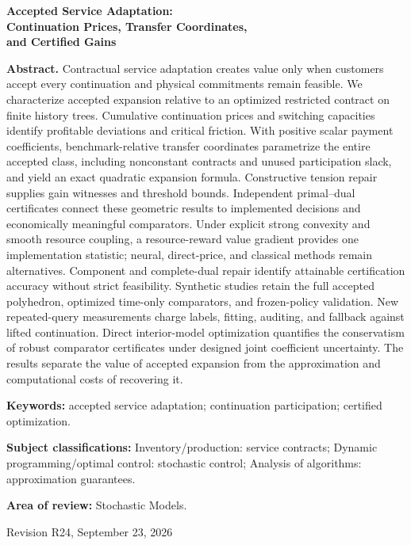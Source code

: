 \documentclass[11pt,letterpaper]{article}
\theoremstyle{definition}
\newcommand{\1}{\mathbf 1}
\begin{document}
\begin{titlepage}\centering
{\Large\bfseries Accepted Service Adaptation:\\ Continuation Prices, Transfer Coordinates,\\ and Certified Gains\par}
\vspace{.3in}{Anonymous manuscript for Operations Research\par}\vspace{.25in}
\begin{minipage}{\textwidth}
\textbf{Abstract.}
Contractual service adaptation creates value only when customers accept every continuation and physical commitments remain feasible. We characterize accepted expansion relative to an optimized restricted contract on finite history trees. Cumulative continuation prices and switching capacities identify profitable deviations and critical friction. With positive scalar payment coefficients, benchmark-relative transfer coordinates parametrize the entire accepted class, including nonconstant contracts and unused participation slack, and yield an exact quadratic expansion formula. Constructive tension repair supplies gain witnesses and threshold bounds. Independent primal--dual certificates connect these geometric results to implemented decisions and economically meaningful comparators. Under explicit strong convexity and smooth resource coupling, a resource-reward value gradient provides one implementation statistic; neural, direct-price, and classical methods remain alternatives. Component and complete-dual repair identify attainable certification accuracy without strict feasibility. Synthetic studies retain the full accepted polyhedron, optimized time-only comparators, and frozen-policy validation. New repeated-query measurements charge labels, fitting, auditing, and fallback against lifted continuation. Direct interior-model optimization quantifies the conservatism of robust comparator certificates under designed joint coefficient uncertainty. The results separate the value of accepted expansion from the approximation and computational costs of recovering it.
\par\vspace{.16in}\textbf{Keywords:} accepted service adaptation; continuation participation; certified optimization.
\par\vspace{.10in}\textbf{Subject classifications:} Inventory/production: service contracts; Dynamic programming/optimal control: stochastic control; Analysis of algorithms: approximation guarantees.
\par\vspace{.10in}\textbf{Area of review:} Stochastic Models.
\end{minipage}\vfill{Revision R24, September 23, 2026\par}\end{titlepage}
\end{document}
